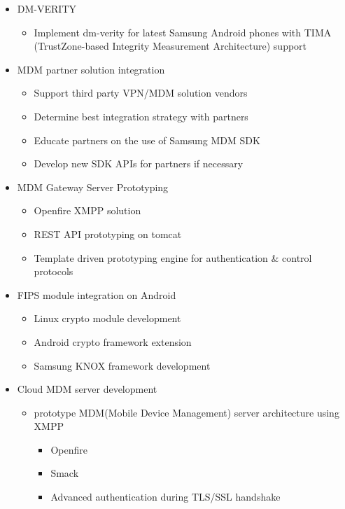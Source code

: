 \documentclass[11pt,a4paper,sans]{moderncv}        %
\begin{document}
\begin{itemize}%
\item DM-VERITY
  \begin{itemize}%
  \item Implement dm-verity for latest Samsung Android phones with TIMA (TrustZone-based Integrity Measurement Architecture) support
  \end{itemize}
\item MDM partner solution integration
  \begin{itemize}%
  \item Support third party VPN/MDM solution vendors
  \item Determine best integration strategy with partners
  \item Educate partners on the use of Samsung MDM SDK
  \item Develop new SDK APIs for partners if necessary
  \end{itemize}
\item MDM Gateway Server Prototyping
  \begin{itemize}%
  \item Openfire XMPP solution
  \item REST API prototyping on tomcat
  \item Template driven prototyping engine for authentication \& control protocols
  \end{itemize}
\item FIPS module integration on Android
  \begin{itemize}%
  \item Linux crypto module development
  \item Android crypto framework extension
  \item Samsung KNOX framework development
  \end{itemize}
\item Cloud MDM server development
  \begin{itemize}%
  \item prototype MDM(Mobile Device Management) server architecture using XMPP
    \begin{itemize}%
    \item Openfire
    \item Smack
    \item Advanced authentication during TLS/SSL handshake
    \end{itemize}
  \end{itemize}
\end{itemize}
\end{document}
